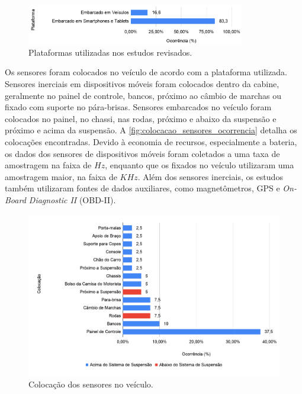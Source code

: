 \begin{figure}[h!]
  \centering
  \caption{Plataformas utilizadas nos estudos revisados.}
   \label{fig:plataformas_ocorrencia}
   \includegraphics[width=0.85\textwidth]{figuras/fig_15.png}
\end{figure}

Os sensores foram colocados no veículo de acordo com a plataforma utilizada. Sensores inerciais em dispositivos móveis foram colocados dentro da cabine, geralmente no painel de controle, bancos, próximo ao câmbio de marchas ou fixado com suporte no pára-brisas. Sensores embarcados no veículo foram colocados no painel, no chassi, nas rodas, próximo e abaixo da suspensão e próximo e acima da suspensão. A \autoref{fig:colocacao_sensores_ocorrencia} detalha os colocações encontradas. Devido à economia de recursos, especialmente a bateria, os dados dos sensores de dispositivos móveis foram coletados a uma taxa de amostragem na faixa de $Hz$, enquanto que os fixados no veículo utilizaram uma amostragem maior, na faixa de $KHz$. Além dos sensores inerciais, os estudos também utilizaram fontes de dados auxiliares, como magnetômetros, GPS e \textit{On-Board Diagnostic II} (OBD-II).

\begin{figure}[h!]
  \centering
  \caption{Colocação dos sensores no veículo.}
   \label{fig:colocacao_sensores_ocorrencia}
   \includegraphics[width=1\textwidth]{figuras/fig_16.png}
\end{figure}

